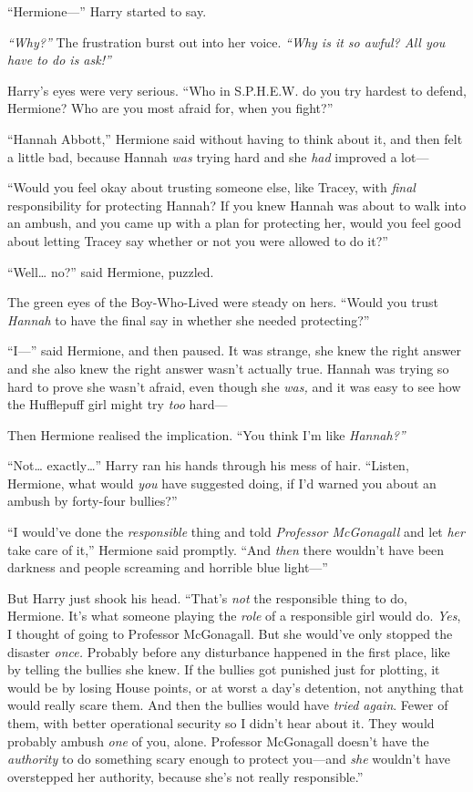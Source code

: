 ``Hermione---'' Harry started to say.

\emph{``Why?''} The frustration burst out into her voice. \emph{``Why is
it so awful? All you have to do is ask!''}

Harry's eyes were very serious. ``Who in S.P.H.E.W. do you try hardest
to defend, Hermione? Who are you most afraid for, when you fight?''

``Hannah Abbott,'' Hermione said without having to think about it, and
then felt a little bad, because Hannah \emph{was} trying hard and she
\emph{had} improved a lot---

``Would you feel okay about trusting someone else, like Tracey, with
\emph{final} responsibility for protecting Hannah? If you knew Hannah
was about to walk into an ambush, and you came up with a plan for
protecting her, would you feel good about letting Tracey say whether or
not you were allowed to do it?''

``Well\ldots{} no?'' said Hermione, puzzled.

The green eyes of the Boy-Who-Lived were steady on hers. ``Would you
trust \emph{Hannah} to have the final say in whether she needed
protecting?''

``I---'' said Hermione, and then paused. It was strange, she knew the
right answer and she also knew the right answer wasn't actually true.
Hannah was trying so hard to prove she wasn't afraid, even though she
\emph{was,} and it was easy to see how the Hufflepuff girl might try
\emph{too} hard---

Then Hermione realised the implication. ``You think I'm like
\emph{Hannah?''}

``Not\ldots{} exactly\ldots{}'' Harry ran his hands through his mess of
hair. ``Listen, Hermione, what would \emph{you} have suggested doing, if
I'd warned you about an ambush by forty-four bullies?''

``I would've done the \emph{responsible} thing and told \emph{Professor
McGonagall} and let \emph{her} take care of it,'' Hermione said
promptly. ``And \emph{then} there wouldn't have been darkness and people
screaming and horrible blue light---''

But Harry just shook his head. ``That's \emph{not} the responsible thing
to do, Hermione. It's what someone playing the \emph{role} of a
responsible girl would do. \emph{Yes}, I thought of going to Professor
McGonagall. But she would've only stopped the disaster \emph{once.}
Probably before any disturbance happened in the first place, like by
telling the bullies she knew. If the bullies got punished just for
plotting, it would be by losing House points, or at worst a day's
detention, not anything that would really scare them. And then the
bullies would have \emph{tried again}. Fewer of them, with better
operational security so I didn't hear about it. They would probably
ambush \emph{one} of you, alone. Professor McGonagall doesn't have the
\emph{authority} to do something scary enough to protect you---and
\emph{she} wouldn't have overstepped her authority, because she's not
really responsible.''

